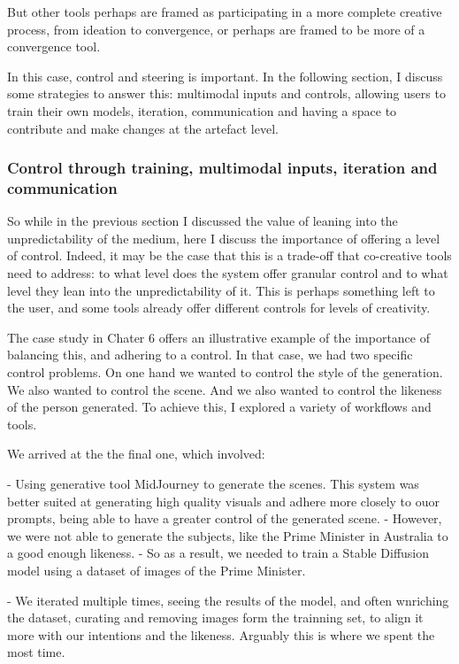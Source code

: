 But other tools perhaps are framed as participating in a more complete creative process, from ideation to convergence, or perhaps are framed to be more of a convergence tool. 

In this case, control and steering is important. In the following section, I discuss some strategies to answer this: multimodal inputs and controls, allowing users to train their own models, iteration, communication and having a space to contribute and make changes at the artefact level. 


\subsubsection{Control through training, multimodal inputs, iteration and communication}


So while in the previous section I discussed the value of leaning into the unpredictability of the medium, here I discuss the importance of offering a level of control. Indeed, it may be the case that this is a trade-off that co-creative tools need to address: to what level does the system offer granular control and to what level they lean into the unpredictability of it. This is perhaps something left to the user, and some tools already offer different controls for levels of creativity. 

The case study in Chater 6 offers an illustrative example of the importance of balancing this, and adhering to a control. In that case, we had two specific control problems. On one hand we wanted to control the style of the generation. We also wanted to control the scene. And we also wanted to control the likeness of the person generated. To achieve this, I explored a variety of workflows and tools. 

We arrived at the the final one, which involved: 

- Using generative tool MidJourney to generate the scenes. This system was better suited at generating high quality visuals and adhere more closely to ouor prompts, being able to have a greater control of the generated scene. 
- However, we were not able to generate the subjects, like the Prime Minister in Australia to a good enough likeness. 
- So as a result, we needed to train a Stable Diffusion model using a dataset of images of the Prime Minister. 

- We iterated multiple times, seeing the results of the model, and often wnriching the dataset, curating and removing images form the trainning set, to align it more with our intentions and the likeness. Arguably this is where we spent the most time. 

